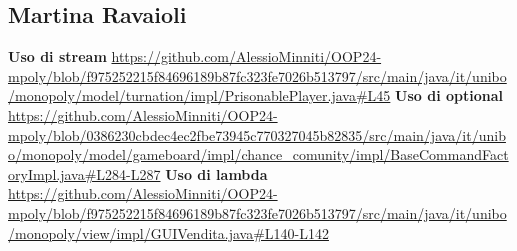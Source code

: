 \subsection{Martina Ravaioli}
\textbf{Uso di stream}\newline
\url{https://github.com/AlessioMinniti/OOP24-mpoly/blob/f975252215f84696189b87fc323fe7026b513797/src/main/java/it/unibo/monopoly/model/turnation/impl/PrisonablePlayer.java#L45}\newline
\textbf{Uso di optional}\newline
\url{https://github.com/AlessioMinniti/OOP24-mpoly/blob/0386230cbdec4ec2fbe73945c770327045b82835/src/main/java/it/unibo/monopoly/model/gameboard/impl/chance_comunity/impl/BaseCommandFactoryImpl.java#L284-L287}\newline
\textbf{Uso di lambda}\newline
\url{https://github.com/AlessioMinniti/OOP24-mpoly/blob/f975252215f84696189b87fc323fe7026b513797/src/main/java/it/unibo/monopoly/view/impl/GUIVendita.java#L140-L142}\newline
